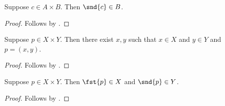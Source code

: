 \begin{classification}\label{snd_type}
    Suppose $c\in A\times B$. Then $\snd{c}\in B$.
\end{classification}
\begin{proof}
    Follows by .
\end{proof}

\begin{proposition}\label{times_elem_is_tuple}
    Suppose $p\in X\times Y$. Then there exist $x, y$
    such that $x\in X$ and $y\in Y$ and $p = (x, y)$.
\end{proposition}
\begin{proof}
    Follows by .
\end{proof}


\begin{proposition}\label{times_proj_elim}
    Suppose $p\in X\times Y$. Then $\fst{p}\in X$ and $\snd{p}\in Y$.
\end{proposition}
\begin{proof}
    Follows by .
\end{proof}
